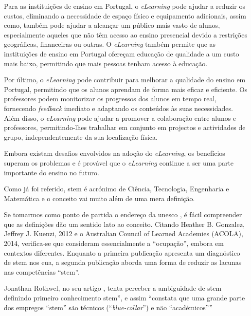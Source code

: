 Para as instituições de ensino em Portugal, o \textit{eLearning} pode ajudar a reduzir os custos, eliminando a necessidade de espaço físico e equipamento adicionais, assim como, também pode ajudar a alcançar um público mais vasto de alunos, especialmente aqueles que não têm acesso ao ensino presencial devido a restrições geográficas, financeiras ou outras. O \textit{eLearning} também permite que as instituições de ensino em Portugal ofereçam educação de qualidade a um custo mais baixo, permitindo que mais pessoas tenham acesso à educação.

Por último, o \textit{eLearning} pode contribuir para melhorar a qualidade do ensino em Portugal, permitindo que os alunos aprendam de forma mais eficaz e eficiente. Os professores podem monitorizar os progressos dos alunos em tempo real, fornecendo \textit{feedback} imediato e adaptando os conteúdos às suas necessidades. Além disso, o \textit{eLearning} pode ajudar a promover a colaboração entre alunos e professores, permitindo-lhes trabalhar em conjunto em projectos e actividades de grupo, independentemente da sua localização física.

Embora existam desafios envolvidos na adoção do \textit{eLearning}, os benefícios superam os problemas e é provável que o \textit{eLearning} continue a ser uma parte importante do ensino no futuro.

Como já foi referido, \acrshort{stem} é acrónimo de Ciência, Tecnologia, Engenharia e Matemática e o conceito vai muito além de uma mera definição.

Se tomarmos como ponto de partida o endereço da \acrshort{unesco} \cite{GlossaryUNESCO}, é fácil compreender que as definições dão um sentido lato ao conceito. Citando Heather B. Gonzalez, Jeffrey J. Kuenzi, 2012 e o Australian Council of Learned Academies (ACOLA), 2014, verifica-se que consideram essencialmente a ``ocupação'', embora em contextos diferentes. Enquanto a primeira publicação apresenta um diagnóstico de \acrshort{stem} nos \acrfull{eua}, a segunda publicação aborda uma forma de reduzir as lacunas nas competências ``\acrshort{stem}''. 

Jonathan Rothwel, no seu artigo \cite{TheHidde2:online}, tenta perceber a ambiguidade de \acrshort{stem} definindo primeiro conhecimento \acrshort{stem}'', e assim ``constata que uma grande parte dos empregos ``\acrshort{stem}'' são técnicos (``\textit{blue-collar}'') e não ``académicos''''

